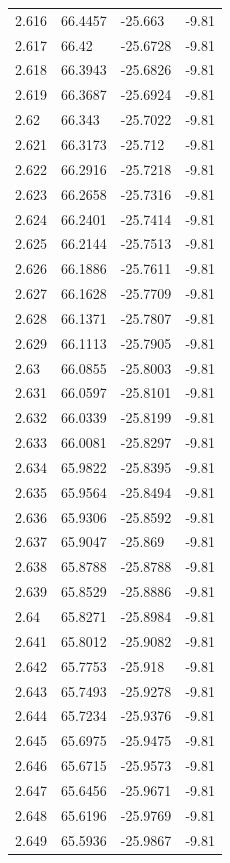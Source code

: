 \begin{tabular}{llll}
2.616 & 66.4457 & -25.663 & -9.81 \\
2.617 & 66.42 & -25.6728 & -9.81 \\
2.618 & 66.3943 & -25.6826 & -9.81 \\
2.619 & 66.3687 & -25.6924 & -9.81 \\
2.62 & 66.343 & -25.7022 & -9.81 \\
2.621 & 66.3173 & -25.712 & -9.81 \\
2.622 & 66.2916 & -25.7218 & -9.81 \\
2.623 & 66.2658 & -25.7316 & -9.81 \\
2.624 & 66.2401 & -25.7414 & -9.81 \\
2.625 & 66.2144 & -25.7513 & -9.81 \\
2.626 & 66.1886 & -25.7611 & -9.81 \\
2.627 & 66.1628 & -25.7709 & -9.81 \\
2.628 & 66.1371 & -25.7807 & -9.81 \\
2.629 & 66.1113 & -25.7905 & -9.81 \\
2.63 & 66.0855 & -25.8003 & -9.81 \\
2.631 & 66.0597 & -25.8101 & -9.81 \\
2.632 & 66.0339 & -25.8199 & -9.81 \\
2.633 & 66.0081 & -25.8297 & -9.81 \\
2.634 & 65.9822 & -25.8395 & -9.81 \\
2.635 & 65.9564 & -25.8494 & -9.81 \\
2.636 & 65.9306 & -25.8592 & -9.81 \\
2.637 & 65.9047 & -25.869 & -9.81 \\
2.638 & 65.8788 & -25.8788 & -9.81 \\
2.639 & 65.8529 & -25.8886 & -9.81 \\
2.64 & 65.8271 & -25.8984 & -9.81 \\
2.641 & 65.8012 & -25.9082 & -9.81 \\
2.642 & 65.7753 & -25.918 & -9.81 \\
2.643 & 65.7493 & -25.9278 & -9.81 \\
2.644 & 65.7234 & -25.9376 & -9.81 \\
2.645 & 65.6975 & -25.9475 & -9.81 \\
2.646 & 65.6715 & -25.9573 & -9.81 \\
2.647 & 65.6456 & -25.9671 & -9.81 \\
2.648 & 65.6196 & -25.9769 & -9.81 \\
2.649 & 65.5936 & -25.9867 & -9.81 \\

\end{tabular}
